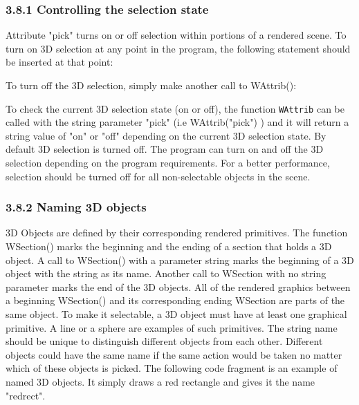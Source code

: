 \documentclass[letterpaper]{article}
\begin{document}
{\subsubsection[3.8.1 Controlling the selection state]{3.8.1 Controlling the selection state}

Attribute \textsf{"pick"} turns on or off selection within
portions of a rendered scene. To turn on 3D selection at any point in
the program, the following statement should be inserted at that
point:


\bigskip



\bigskip

To turn off the 3D selection, simply make another call to \textsf{WAttrib()}:


\bigskip



\bigskip

To check the current 3D selection state (on or off), the function
\texttt{WAttrib} can be called with the string parameter
\textsf{"pick"} (i.e
\textsf{WAttrib("pick")} ) and it will return a string value of
\textsf{"on"} or
\textsf{"off"} depending on the current 3D
selection state. By default 3D selection is turned off. The program
can turn on and off the 3D selection depending on the program
requirements. For a better performance, selection should be turned off
for all non-selectable objects in the scene.


\subsubsection[3.8.2 Naming 3D objects]{3.8.2 Naming 3D objects}

3D Objects are defined by their corresponding rendered primitives. The
function \textsf{WSection()} marks the beginning and the ending of a
section that holds a 3D object. A call to \textsf{WSection()} with a
parameter string marks the beginning of a 3D object with the string as
its name. Another call to \textsf{WSection} with no string parameter
marks the end of the 3D objects. All of the rendered graphics between
a beginning \textsf{WSection()} and its corresponding ending
\textsf{WSection} are parts of the same object. To make it selectable,
a 3D object must have at least one graphical primitive. A line or a
sphere are examples of such primitives. The string name should be
unique to distinguish different objects from each other. Different
objects could have the same name if the same action would be taken no
matter which of these objects is picked. The following code fragment
is an example of named 3D objects. It simply draws a red rectangle and
gives it the name "redrect".


}
\end{document}
